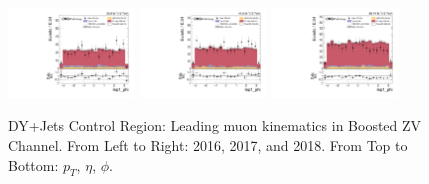 \begin{figure}[!ht]
  \includegraphics[width=0.30\textwidth]{analysis_plots/2016_zv/cr_vjets_m/lep1_phi.pdf}
  \includegraphics[width=0.30\textwidth]{analysis_plots/2017_zv/cr_vjets_m/lep1_phi.pdf}
  \includegraphics[width=0.30\textwidth]{analysis_plots/2018_zv/cr_vjets_m/lep1_phi.pdf} \\
  \caption[DY+Jets Control Region: Leading muon kinematics in Boosted ZV Channel]%
  {DY+Jets Control Region: Leading muon kinematics in Boosted ZV Channel. From Left to Right: 2016,
    2017, and 2018. From Top to Bottom: \( p_T \), \( \eta \), \( \phi \).}%
  \label{fig:zv-cr-vjets-m-lep1-pt-eta-phi}
\end{figure}

